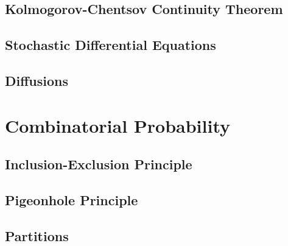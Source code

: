 \documentclass[11pt]{report} %
\begin{document}
\section{Kolmogorov-Chentsov Continuity Theorem}

\section{Stochastic Differential Equations}

\section{Diffusions}

\chapter{Combinatorial Probability}

\section{Inclusion-Exclusion Principle}

\section{Pigeonhole Principle}

\section{Partitions}
\end{document}
